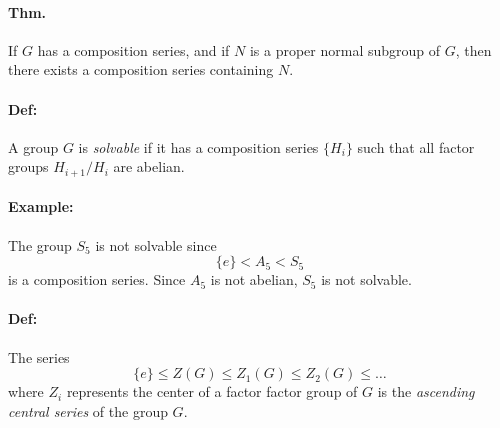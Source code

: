 \documentclass[10pt,a4paper]{article}
\begin{document}
\paragraph{Thm.} If $G$ has a composition series, and if $N$ is a proper normal subgroup of $G$, then there exists a composition series containing $N$.

\paragraph{Def:} A group $G$ is \textit{solvable} if it has a composition series $\{H_i\}$ such that all factor groups $H_{i+1}/H_i$ are abelian.

\paragraph{Example:} The group $S_5$ is not solvable since
$$ \{e\} < A_5 < S_5$$
is a composition series. Since $A_5$ is not abelian, $S_5$ is not solvable.

\paragraph{Def:} The series
$$ \{e\} \leq Z(G) \leq Z_1(G) \leq Z_2(G) \leq \dots$$
where $Z_i$ represents the center of a factor factor group of $G$ is the \textit{ascending central series} of the group $G$.
\end{document}
